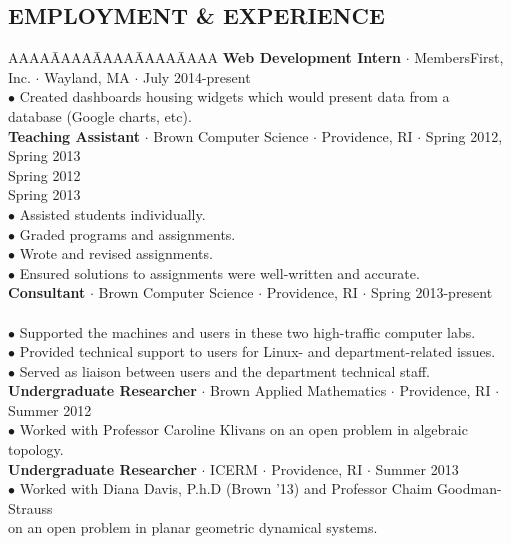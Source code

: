 \documentclass{res}
\begin{document}
\begin{resume}
\section{EMPLOYMENT \& EXPERIENCE}
   \myvspace
   \begin{tabbing}
   AAAA\=AAAA\=AAAA\=AAAA\=AAAA\kill
 {\bf Web Development Intern} $\cdot$ MembersFirst, Inc. $\cdot$ Wayland, MA $\cdot$ July 2014-present\\
	\>$\bullet$ Created dashboards housing widgets which would present data from a\\ 
	\>\phantom{$\bullet$} database (Google charts, etc).\\
 \sbreak
 {\bf Teaching Assistant} $\cdot$ Brown Computer Science $\cdot$ Providence, RI $\cdot$ Spring 2012, Spring 2013\\
	\>Spring 2012 \\
	\>Spring 2013 \\
	\>$\bullet$  Assisted students individually.\\
	\>$\bullet$  Graded programs and assignments.\\
	\>$\bullet$  Wrote and revised assignments.\\
	\>$\bullet$  Ensured solutions to assignments were well-written and accurate.\\
\sbreak
{\bf Consultant} $\cdot$ Brown Computer Science $\cdot$ Providence, RI $\cdot$ Spring 2013-present\\
	\\
	\>$\bullet$ Supported the machines and users in these two high-traffic computer labs.\\
	\>$\bullet$ Provided technical support to users for Linux- and department-related issues.\\
	\>$\bullet$ Served as  liaison between users and the department technical staff.\\
\sbreak
{\bf Undergraduate Researcher} $\cdot$ Brown Applied Mathematics $\cdot$ Providence, RI $\cdot$ Summer 2012\\
\>$\bullet$ Worked with Professor Caroline Klivans on an open problem in algebraic topology.\\

{\bf Undergraduate Researcher} $\cdot$ ICERM $\cdot$ Providence, RI $\cdot$ Summer 2013\\
	\>$\bullet$ Worked with Diana Davis, P.h.D (Brown '13) and Professor Chaim Goodman-Strauss\\\>\phantom{$\bullet$} on an open problem in planar geometric dynamical systems.\\


\end{tabbing}
\end{resume}
\end{document}
